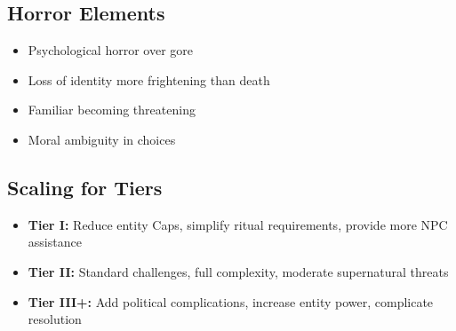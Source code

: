 \documentclass[11pt]{article}
\begin{document}
\subsection{Horror Elements}
\begin{itemize}
\item Psychological horror over gore
\item Loss of identity more frightening than death
\item Familiar becoming threatening
\item Moral ambiguity in choices
\end{itemize}

\subsection{Scaling for Tiers}
\begin{itemize}
\item \textbf{Tier I:} Reduce entity Caps, simplify ritual requirements, provide more NPC assistance
\item \textbf{Tier II:} Standard challenges, full complexity, moderate supernatural threats
\item \textbf{Tier III+:} Add political complications, increase entity power, complicate resolution
\end{itemize}
\end{document}
